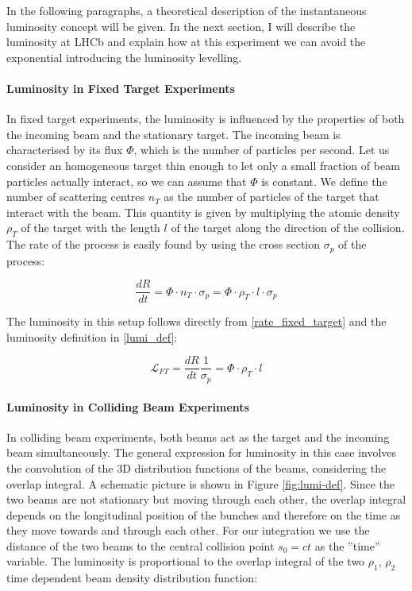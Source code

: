 In the following paragraphs, a theoretical description of the instantaneous luminosity concept will be given.
In the next section, I will describe the luminosity at LHCb and explain how at this experiment we can avoid the exponential introducing the luminosity levelling.

\paragraph{Luminosity in Fixed Target Experiments}
In fixed target experiments, the luminosity is influenced by the properties of both the incoming beam and the stationary target. The incoming beam is characterised by its flux $\Phi$, which is the number of particles per second. Let us consider an homogeneous target thin enough to let only a small fraction of beam particles actually
interact, so we can assume that $\Phi$ is constant. We define the number of scattering centres $n_T$ as the number of particles of the target that interact with the beam. This quantity is given by multiplying the atomic density $\rho_T$ of the target with the length $l$ of the target along the direction of the collision.  
The rate of the process is easily found by using the cross section $\sigma_p$ of the process:

\begin{equation}
\frac{dR}{dt} =\Phi \cdot n_T \cdot \sigma_p = \Phi \cdot \rho_T \cdot l \cdot \sigma_p\label{rate_fixed_target}
\end{equation}

The luminosity in this setup follows directly from \eqref{rate_fixed_target} and the luminosity definition in \eqref{lumi_def}:

\begin{equation}
\mathcal{L}_{FT} = \frac{dR}{dt}\frac{1}{\sigma_p} = \Phi \cdot \rho_T \cdot l
\end{equation}

\paragraph{Luminosity in Colliding Beam Experiments}
In colliding beam experiments, both beams act as the target and the incoming beam simultaneously. The general expression for luminosity in this case involves the convolution of the 3D distribution functions of the beams, considering the overlap integral. A schematic picture is shown in Figure \ref{fig:lumi-def}\cite{Herr:941318}. Since the two beams are not stationary but moving through each other, the overlap integral depends on the longitudinal position of the bunches and therefore on the time as they move towards and through each other. For our integration we use the distance of the two beams to the central collision point $s_0 = ct$ as the ”time” variable. 
The luminosity is proportional to the overlap integral of the two  $\rho_1$, $\rho_2$ time dependent beam density distribution function:


